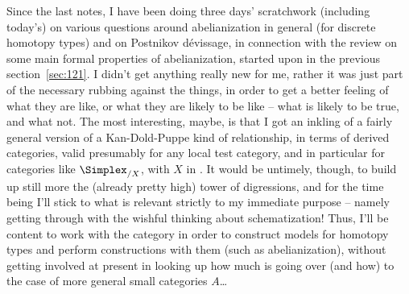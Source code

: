 \label{sec:122}%
Since the last notes, I have been doing three days' scratchwork
(including today's) on various questions around abelianization in
general (for discrete homotopy types) and on Postnikov dévissage, in
connection with the review on some main formal properties of
abelianization, started upon in the previous section~\ref{sec:121}. I
didn't get anything really new for me, rather it was just part of the
necessary rubbing against the things, in order to get a better feeling
of what they are like, or what they are likely to be like -- what is
likely to be true, and what not. The most interesting, maybe, is that
I got an inkling of a fairly general version of a Kan-Dold-Puppe kind
of relationship, in terms of derived categories, valid presumably for
any local test category, and in particular for categories like
$\Simplex_{/X}$, with $X$ in \Simplexhat. It would be untimely,
though, to build up still more the (already pretty high) tower of
digressions, and for the time being I'll stick to what is relevant
strictly to my immediate purpose -- namely getting through with the
wishful thinking about schematization! Thus, I'll be content to work
with the category \Simplex{} in order to construct models for homotopy
types and perform constructions with them (such as abelianization),
without getting involved at present in looking up how much is going
over (and how) to the case of more general small categories $A$\dots

